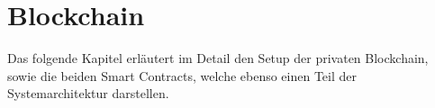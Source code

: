 

\section{Blockchain}
\label{sec:bchain}

Das folgende Kapitel erläutert im Detail den Setup der privaten Blockchain, sowie die beiden Smart Contracts, welche ebenso einen Teil der Systemarchitektur darstellen.

